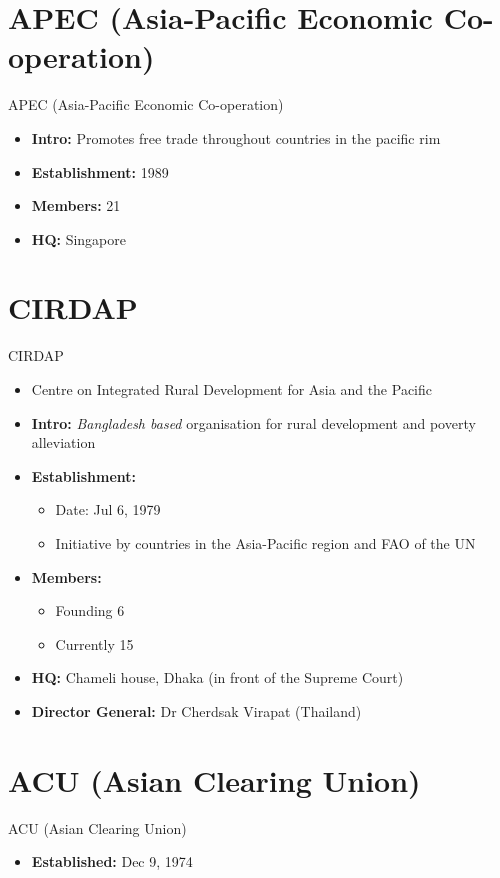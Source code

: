 \documentclass[
  10pt,
  ignorenonframetext,
  progressbar=frametitle]{beamer}
\providecommand{\tightlist}{%
  \setlength{\itemsep}{0pt}\setlength{\parskip}{0pt}}
\begin{document}
\section{APEC (Asia-Pacific Economic Co-operation)}
\begin{frame}[allowframebreaks]
{APEC (Asia-Pacific Economic Co-operation)}
\protect\hypertarget{apec-asia-pacific-economic-co-operation}{}
\begin{itemize}
\tightlist
\item
  \textbf{Intro:} Promotes free trade throughout countries in the
  pacific rim
\item
  \textbf{Establishment:} 1989
\item
  \textbf{Members:} 21
\item
  \textbf{HQ:} Singapore
\end{itemize}
\end{frame}

\section{CIRDAP}
\begin{frame}[allowframebreaks]
{CIRDAP}
\protect\hypertarget{cirdap}{}
\begin{itemize}
\tightlist
\item
  Centre on Integrated Rural Development for Asia and the Pacific
\item
  \textbf{Intro:} \emph{Bangladesh based} organisation for rural
  development and poverty alleviation
\item
  \textbf{Establishment:}

  \begin{itemize}
  \tightlist
  \item
    Date: Jul 6, 1979
  \item
    Initiative by countries in the Asia-Pacific region and FAO of the UN
  \end{itemize}
\item
  \textbf{Members:}

  \begin{itemize}
  \tightlist
  \item
    Founding 6
  \item
    Currently 15
  \end{itemize}
\item
  \textbf{HQ:} Chameli house, Dhaka (in front of the Supreme Court)
\item
  \textbf{Director General:} Dr Cherdsak Virapat (Thailand)
\end{itemize}
\end{frame}

\section{ACU (Asian Clearing Union)}
\begin{frame}[allowframebreaks]
{ACU (Asian Clearing Union)}
\protect\hypertarget{acu-asian-clearing-union}{}
\begin{itemize}
\tightlist
\item
  \textbf{Established:} Dec 9, 1974
\end{itemize}
\end{frame}
\end{document}
